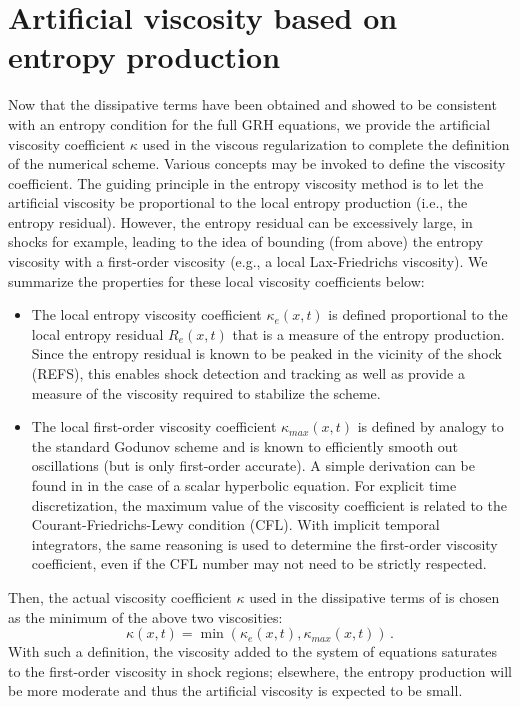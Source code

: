 \documentclass[times,doublespace]{fldauth}%
\begin{document}
\section{Artificial viscosity based on entropy production}
\label{sec:def-visc-coeff}
%
Now that the dissipative terms have been obtained and showed to be consistent with an entropy condition for the full GRH
equations, we provide the artificial viscosity coefficient $\kappa$ used in the viscous regularization to complete the 
definition of the numerical scheme. Various concepts may be invoked to define the viscosity coefficient. The guiding principle
in the entropy viscosity method \cite{some jlg} is to let the artificial viscosity be proportional to the local entropy
production (i.e., the entropy residual). However, the entropy residual can be excessively large, in shocks for example, leading
to the idea of bounding (from above) the entropy viscosity with a first-order viscosity (e.g., a local Lax-Friedrichs viscosity).
We summarize the properties for these local viscosity coefficients below:
\begin{itemize}
\item The local entropy viscosity coefficient $\kappa_e(x,t)$ is defined proportional to the local entropy residual $R_e(x,t)$ that 
is a measure of the entropy production. Since the entropy residual is known to be peaked in the vicinity of the shock (REFS), 
this enables shock detection and tracking as well as provide a measure of the viscosity required to stabilize the scheme. 
\item The local first-order viscosity coefficient $\kappa_{max}(x,t)$ is defined by analogy to the standard Godunov scheme and is known to efficiently 
smooth out oscillations (but is only first-order accurate). A simple derivation can be found in \cite{jlg1} in the case of a scalar 
hyperbolic equation. For explicit time discretization, the maximum value of the viscosity coefficient is related to the 
Courant-Friedrichs-Lewy condition (CFL). With implicit temporal integrators, the same reasoning is used to determine the
first-order viscosity coefficient, even if the CFL number may not need to be strictly respected. 
\end{itemize}
%
Then, the actual viscosity coefficient $\kappa$ used in the dissipative terms of  is chosen
as the minimum of the above two viscosities:  
%
\begin{equation}
\kappa(x,t) = \min ( \kappa_e(x,t), \kappa_{max}(x,t) ) \, . 
\end{equation}
%
With such a definition, the viscosity added to the system of equations saturates to the first-order viscosity in shock regions; elsewhere, 
the entropy production will be more moderate and thus the artificial viscosity is expected to be small.
\end{document}
